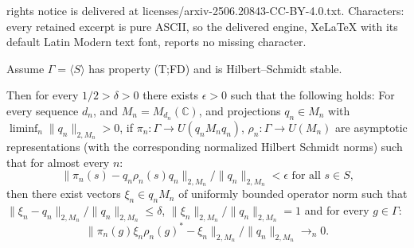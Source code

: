 \documentclass[10pt,a4paper]{amsart}
\newcommand{\C}{{\mathbb{C}}}
\begin{document}
rights notice is delivered at licenses/arxiv-2506.20843-CC-BY-4.0.txt. Characters: every retained excerpt is pure ASCII, so the delivered engine, XeLaTeX with its default Latin Modern text font, reports no missing character.
\begin{proposition}
\label{prop:rigidity_almost_rep}
Assume $\Gamma = \langle S \rangle$ has property (T;FD) and is Hilbert--Schmidt stable.

Then for every $1/2 > \delta>0$ there exists $\epsilon> 0$ such that the following holds:
For every sequence $d_n$, and $M_n = M_{d_n}(\C)$, and projections $q_n \in M_n$ with $\liminf_n \| q_n\|_{2,M_n} > 0$, if  $\pi_n:\Gamma\rightarrow U(q_n M_n q_n)$, $\rho_n: \Gamma \to U( M_n )$ are asymptotic representations (with the corresponding normalized Hilbert Schmidt norms) such that for almost every $n$:
$$\| \pi_n(s) - q_n\rho_n(s) q_n\|_{2,M_n} / \|q_n \|_{2,M_n}< \epsilon \text{ for all $s \in S$,}$$
then there exist vectors $\xi_n \in q_nM_n$ of uniformly bounded operator norm such that $ \| \xi_n -q_n \|_{2,M_n}  / \| q_n \|_{2,M_n}\leq \delta$, $\| \xi_n \|_{2,M_n} / \| q_n \|_{2,M_n} =1$ and for  every $g \in \Gamma$:
$$\| \pi_n(g)  \xi_n\rho_n(g)^* - \xi_n\|_{2,M_n} / \|q_n \|_{2,M_n}  \to_n 0.$$




\end{proposition}
\end{document}
